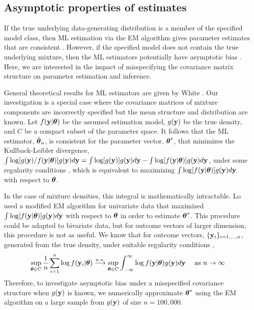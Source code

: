 \subsection{Asymptotic properties of estimates}
If the true underlying data-generating distribution is a member of the specified model class, then ML estimation via the EM algorithm gives parameter estimates that are consistent  \cite{wald1949, lecam1953}. However, if the specified model does not contain the true underlying mixture, then the ML estimators potentially have asymptotic bias \cite{gray1994,lo2011}. Here, we are interested in the impact of misspecifying the covariance matrix structure on parameter estimation and inference.

General theoretical results for ML estimators are given by White \cite{white1982}. Our investigation is a special case where the covariance matrices of mixture components are incorrectly specified but the mean structure and distribution are known. Let $f(\mathbf y|\boldsymbol \theta)$ be the assumed estimation model, $g(\mathbf y)$ be the true density, and $C$ be a compact subset of the parameter space. It follows that the ML estimator, $\hat{\boldsymbol\theta}_{n}$, is consistent for the parameter vector, $\boldsymbol\theta^{*}$, that minimizes the Kullback-Leibler divergence, $\int \log[g(\mathbf y)/f(\mathbf y|\boldsymbol\theta)]g(\mathbf y)d\mathbf y=\int \log[g(\mathbf y)]g(\mathbf y)d\mathbf y-\int \log[f(\mathbf y|\boldsymbol\theta)]g(\mathbf y)d\mathbf y$, under some regularity conditions \cite{white1982}, which is equivalent to maximizing $\int \log[f(\mathbf y|\boldsymbol\theta)]g(\mathbf y)d\mathbf y$ with respect to $\boldsymbol\theta$.  

In the case of mixture densities, this integral is mathematically intractable. Lo \cite{lo2011} used a modified EM algorithm for univariate data that maximized $\int \log[f(\mathbf y|\boldsymbol\theta)]g(\mathbf y)d\mathbf y$  with respect to $\boldsymbol \theta$ in order to estimate $\boldsymbol\theta^{*}$. This procedure could be adapted to bivariate data, but for outcome vectors of larger dimension, this procedure is not as useful.  We know that for outcome vectors, $\{\mathbf y_i\}_{i=1,...,n}$, generated from the true density, under suitable regularity conditions \cite{jennrich1969},
$$\sup_{\boldsymbol \theta\in C}\frac{1}{n}\sum_{i=1}^{n} \log f(\mathbf y_{i}|\boldsymbol \theta)\overset{a.s.}{\longrightarrow} \sup_{\boldsymbol \theta\in C} \int^{\infty}_{-\infty} \log f(\mathbf y|\boldsymbol \theta)g(\mathbf y)d\mathbf y \quad \text{ as } n\rightarrow \infty$$
Therefore, to investigate asymptotic bias under a misspecified covariance structure when $g(\mathbf y)$ is known, we numerically approximate $\boldsymbol\theta^{*}$ using the EM algorithm on a large sample from $g(\mathbf y)$ of size $n=100,000$. 

